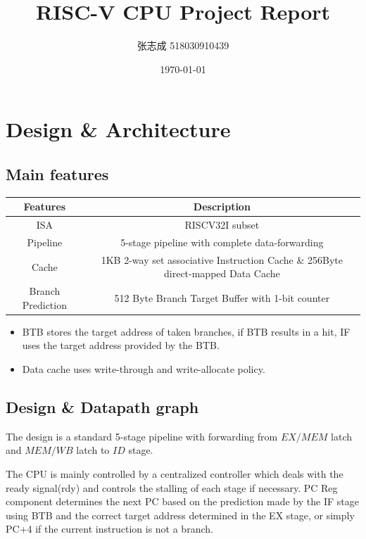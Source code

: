 \documentclass[UTF8, 12pt]{ctexart}
\title{RISC-V CPU Project Report}
\author{张志成 518030910439}
\date{\today}
\begin{document}
    \maketitle\medskip
    \section{Design \& Architecture}
        \subsection{Main features}
            \begin{center}
                \begin{tabular}{ |c|c| } 
                \hline
                    \textbf{Features} & \textbf{Description} \\
                \hline
                    ISA & RISCV32I subset \\
                \hline
                    Pipeline & 5-stage pipeline with complete data-forwarding \\
                \hline
                    Cache & 1KB 2-way set associative Instruction Cache \& 256Byte direct-mapped Data Cache\\
                \hline
                    Branch Prediction & 512 Byte Branch Target Buffer with 1-bit counter\\
                \hline
                \end{tabular}
            \end{center}
            \begin{itemize}
                \item BTB stores the target address of taken branches, if BTB results in a hit, IF uses the target address provided by the BTB. 
                \item Data cache uses write-through and write-allocate policy.
            \end{itemize}
        \subsection{Design \& Datapath graph}
            The design is a standard 5-stage pipeline with forwarding from $EX/MEM$ latch and $MEM/WB$ latch to $ID$ stage.

            The CPU is mainly controlled by a centralized controller which deals with the ready signal(rdy) and controls the stalling of each stage if necessary.
            PC Reg component determines the next PC based on the prediction made by the IF stage using BTB and the correct target address determined in the EX stage, or simply PC+4 if the current instruction is not a branch. 
\end{document}
